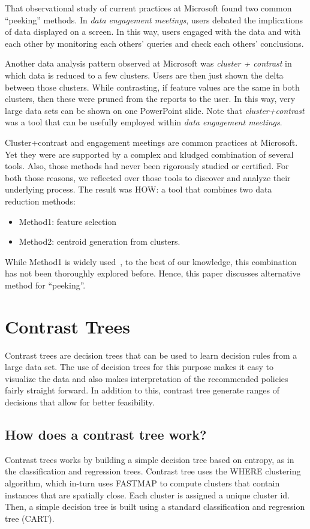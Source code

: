 \documentclass[conference]{IEEEtran}
\newcommand{\bi}{\begin{itemize}}
\newcommand{\ei}{\end{itemize}}
\begin{document}
That observational study of current practices
at Microsoft found two common ``peeking'' methods.
In {\em data engagement meetings},
users debated the implications of data 
displayed on a screen. In this way, users
engaged with the data and with each other by
monitoring each others' queries and check each others'
conclusions.  

Another data analysis pattern observed
at Microsoft was  {\em cluster + contrast} in which
data is  reduced to a few
  clusters. Users are then just shown the delta between those
  clusters. While contrasting, if feature values are
  the same in both clusters, then these were pruned from
  the reports to the user. In this way, very large
data sets can be shown on one PowerPoint 
slide. Note that {\em cluster+contrast} was a tool that can be usefully employed within
{\em data engagement meetings}.


Cluster+contrast and engagement
meetings are common practices at Microsoft. Yet they were
are supported by a complex and kludged combination of several
tools. Also, those methods had never been rigorously studied or certified.
For both those reasons,
 we reflected over those tools to discover and analyze their
underlying process. The result was HOW: a tool
that combines two 
data reduction methods:\bi
\item Method1: feature selection
\item Method2: centroid generation from   clusters.
\ei
While Method1 is widely used~\cite{menziesLearnToPredict},
to the best of our knowledge, this combination has not been thoroughly explored before.
Hence, this paper discusses alternative method for ``peeking''.


\section{Contrast Trees}
Contrast trees are decision trees that can be used to learn decision rules from a large data set. The use of decision trees for this purpose makes it easy to visualize the data and also makes interpretation of the recommended policies fairly straight forward. In addition to this, contrast tree generate ranges of decisions that allow for better feasibility.
\subsection{How does a contrast tree work?}
Contrast trees works by building a simple decision tree based on entropy, as in the classification and regression trees. Contrast tree uses the WHERE clustering algorithm, which in-turn uses FASTMAP \cite{} to compute clusters 
that contain instances that are spatially close. Each cluster is assigned a unique cluster id. Then, a simple decision tree is built using a standard classification and regression tree (CART). 
\end{document}
